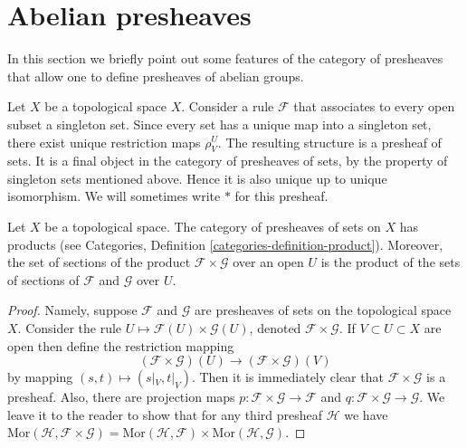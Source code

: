 \section{Abelian presheaves}
\label{section-abelian-presheaves}

\noindent
In this section we briefly point out some features of the
category of presheaves that allow one to define presheaves
of abelian groups.

\begin{example}
\label{example-singleton-presheaf}
Let $X$ be a topological space $X$. Consider a rule $\mathcal{F}$ that
associates to every open subset a singleton set. Since every set
has a unique map into a singleton set, there exist unique restriction
maps $\rho^U_V$. The resulting structure is a presheaf of sets.
It is a final object in the category of presheaves of sets, by the
property of singleton sets mentioned above. Hence it is
also unique up to unique isomorphism. We will sometimes write $*$
for this presheaf.
\end{example}

\begin{lemma}
\label{lemma-product-presheaves}
Let $X$ be a topological space. The category of presheaves of sets
on $X$ has products (see
Categories, Definition \ref{categories-definition-product}).
Moreover, the set of
sections of the product $\mathcal{F} \times \mathcal{G}$
over an open $U$ is the product of the sets of sections of
$\mathcal{F}$ and $\mathcal{G}$ over $U$.
\end{lemma}

\begin{proof}
Namely, suppose $\mathcal{F}$ and $\mathcal{G}$ are
presheaves of sets on the topological space $X$.
Consider the rule $U \mapsto \mathcal{F}(U) \times \mathcal{G}(U)$,
denoted $\mathcal{F}\times \mathcal{G}$. If $V \subset U \subset X$
are open then define the restriction mapping
$$
(\mathcal{F} \times \mathcal{G})(U)
\longrightarrow
(\mathcal{F} \times \mathcal{G})(V)
$$
by mapping $(s, t) \mapsto (s|_V, t|_V)$. Then it is immediately
clear that $\mathcal{F}\times\mathcal{G}$ is a presheaf.
Also, there are projection maps
$p : \mathcal{F}\times\mathcal{G} \to \mathcal{F}$
and 
$q : \mathcal{F}\times\mathcal{G} \to \mathcal{G}$.
We leave it to the reader to show that
for any third presheaf $\mathcal{H}$ we have
$\text{Mor}(\mathcal{H}, \mathcal{F}\times \mathcal{G})
= \text{Mor}(\mathcal{H}, \mathcal{F}) \times
\text{Mor}(\mathcal{H}, \mathcal{G})$.
\end{proof}

